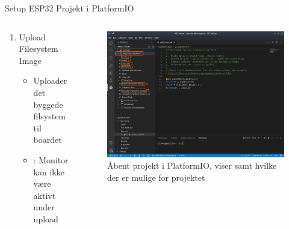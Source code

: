 \documentclass[aspectratio=169]{beamer}
\begin{document}
\begin{frame}{Setup ESP32 Projekt i PlatformIO}
\begin{columns}
\begin{column}{0.5\textwidth}
\begin{textBox}
\begin{itemize}
\begin{enumerate}
					\item Upload Filesystem Image
					\begin{itemize}
						\item Uploader det byggede filsystem til boardet
						\item {}: Monitor kan ikke være aktivt under upload
					\end{itemize}
				\end{enumerate}
			\end{itemize}
		\end{textBox}
	\end{column}
	\begin{column}{0.5\textwidth}
		\begin{figure}
  			\includegraphics[width=\textwidth,keepaspectratio=true]{assets/pictures/pio-project-3.png}
  			\caption{Åbent projekt i PlatformIO, viser  samt hvilke  der er mulige for projektet}
  			\label{fig:pio-project3}
		\end{figure}
	\end{column}
\end{columns}
\end{frame}
\end{document}
